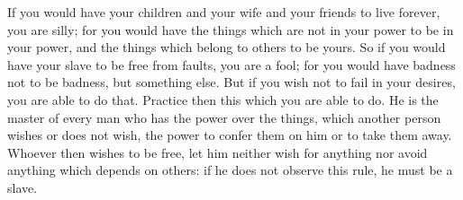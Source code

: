 If you would have your children and your wife and your friends to live forever,
you are silly; for you would have the  things which are not in your power to be
in your  power, and the things  which belong to others  to be yours. So  if you
would have  your slave to be  free from faults, you  are a fool; for  you would
have badness not to be badness, but something else. But if you wish not to fail
in your desires, you are able to do that. Practice then this which you are able
to do. He is  the master of every man who has the  power over the things, which
another person wishes or  does not wish, the power to confer them  on him or to
take  them away.  Whoever then  wishes to  be free,  let him  neither wish  for
anything nor  avoid anything which  depends on others:  if he does  not observe
this rule, he must be a slave.
